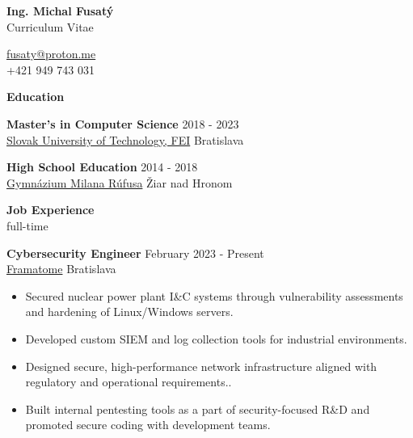 \documentclass[12pt]{article}
\begin{document}
\begingroup
{}
\begin{center}
	{\Large \bfseries Ing. Michal Fusatý} \\
	{\large Curriculum Vitae} 	
\end{center}
\endgroup


\begin{center}
	\noindent
	\href{mailto:fusaty@proton.me}{fusaty@proton.me} \\[0.04in]    
	+421 949 743 031 \\
\end{center}
	\noindent

    

\begin{center}
	{\noindent \bfseries Education}
\end{center} 

\noindent
{\bfseries Master's in Computer Science} \hfill 2018 - 2023\\[0.04in] 
\noindent \href{https://www.fei.stuba.sk/english.html?page_id=793}{Slovak University of Technology, FEI} \hfill Bratislava
\noindent

\vspace{0.12in}

\noindent
{\bfseries High School Education} \hfill 2014 - 2018\\ 
\noindent \href{https://gymziar.edupage.org/}{Gymnázium Milana Rúfusa}  \hfill Žiar nad Hronom
\noindent


\vspace{0.12in} %

\begin{center}
	{\noindent \bfseries Job Experience} \\
    {full-time} \\
\end{center}

\noindent
{\bfseries Cybersecurity Engineer} \hfill February 2023 - Present \\[0.04in]  
\noindent \href{https://www.framatome.com/en/about/}{Framatome} \hfill Bratislava
\begin{itemize} \itemsep -2pt %
\item Secured nuclear power plant I\&C systems through vulnerability assessments and hardening of Linux/Windows servers.
\item Developed custom SIEM and log collection tools for industrial environments.
\item Designed secure, high-performance network infrastructure aligned with regulatory and operational requirements..
\item Built internal pentesting tools as a part of security-focused R\&D and promoted secure coding with development teams.
\end{itemize}
\end{document}
